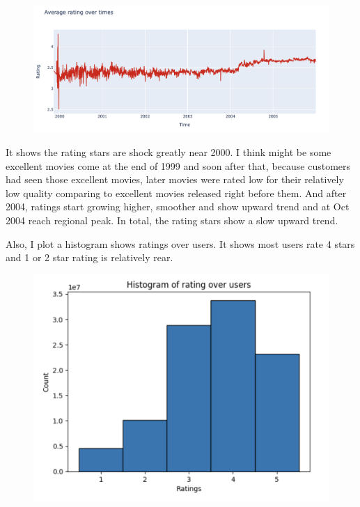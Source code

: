 \documentclass{article}
\begin{document}
\begin{enumerate}
\begin{center}
    \begin{figure}[H]
    \centering
    \includegraphics[width = 17cm]{images/rating over time.png}
    \end{figure}
\end{center}
{
\linespread{1.5} \selectfont
It shows the rating stars are shock greatly near 2000. I think might be some excellent movies come at the end of 1999 and soon after that, because customers had seen those excellent movies, later movies were rated low for their relatively low quality comparing to excellent movies released right before them. And after 2004, ratings start growing higher, smoother and show upward trend and at Oct 2004 reach regional peak. In total, the rating stars show a slow upward trend.
}

Also, I plot a histogram shows ratings over users. It shows most users rate 4 stars and 1 or 2 star rating is relatively rear.
\begin{figure}[H]
    \centering
    \includegraphics[width = 13cm]{images/ratings over user.png}
\end{figure}


\end{enumerate}
\end{document}
